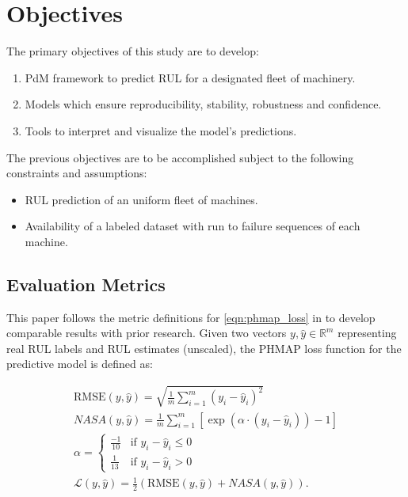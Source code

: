 \documentclass{IEEEtran}
\begin{document}
    \section{Objectives} \label{sec:objectives}

        The primary objectives of this study are to develop:
        \begin{enumerate}
            \item PdM framework to predict RUL for a designated fleet of machinery.
            \item Models which ensure reproducibility, stability, robustness and confidence.
            \item Tools to interpret and visualize the model's predictions.
        \end{enumerate}

        The previous objectives are to be accomplished subject to the following constraints and assumptions:
        \begin{itemize}
            \item RUL prediction of an uniform fleet of machines.
            \item Availability of a labeled dataset with run to failure sequences of each machine.
        \end{itemize}

        \subsection{Evaluation Metrics}

            This paper follows the metric definitions for \eqref{eqn:phmap_loss} in \cite{ncmapss-dataset} to develop comparable results with prior research. Given two vectors $y, \hat{y} \in \mathbb{R}^{m}$ representing real RUL labels and RUL estimates (unscaled), the PHMAP loss function for the predictive model is defined as:

            \begin{equation} \label{eqn:phmap_loss}
                \begin{gathered}
                    \text{RMSE}(y, \hat{y}) = \sqrt{\frac{1}{m}\sum_{i=1}^{m} (y_i - \hat{y}_i)^{2}} \\
                    \textit{NASA}(y, \hat{y}) = \frac{1}{m}\sum_{i=1}^{m} \left[\exp (\alpha \cdot (y_i - \hat{y}_i)) - 1\right]\\
                    \alpha = \begin{cases}
                        \frac{-1}{10} & \text{if } y_i - \hat{y}_i \leq 0 \\
                        \frac{1}{13} & \text{if } y_i - \hat{y}_i > 0
                    \end{cases}  \\
                    \mathcal{L}(y, \hat{y}) = \frac{1}{2} \left(\text{RMSE}(y, \hat{y}) + \textit{NASA}(y, \hat{y})\right). \\
                \end{gathered}
            \end{equation}
\end{document}
